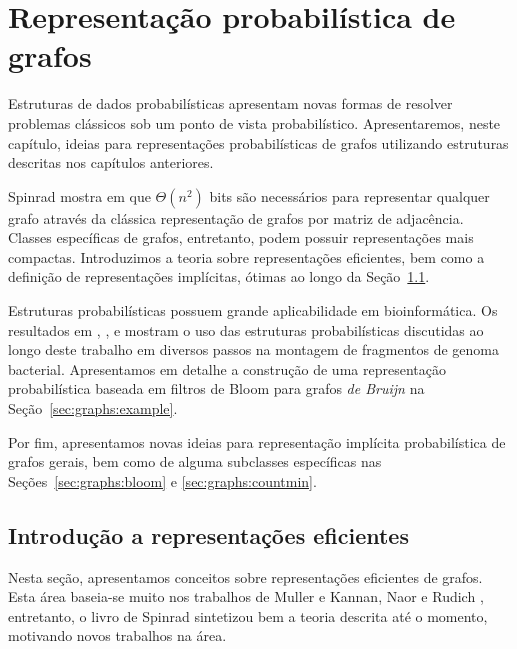\chapter{Representação probabilística de grafos}\label{cap:graphs}

Estruturas de dados probabilísticas apresentam novas formas de resolver problemas clássicos sob um ponto de vista probabilístico. Apresentaremos, neste capítulo, ideias para representações probabilísticas de grafos utilizando estruturas descritas nos capítulos anteriores.

Spinrad mostra em \cite{spinrad2003efficient} que $\Theta(n^2)$ bits são necessários para representar qualquer grafo através da clássica representação de grafos por matriz de adjacência. Classes específicas de grafos, entretanto, podem possuir representações mais compactas. Introduzimos a teoria sobre representações eficientes, bem como a definição de representações implícitas, ótimas ao longo da Seção~\ref{sec:graphs:implicit}.

Estruturas probabilísticas possuem grande aplicabilidade em bioinformática. Os resultados em \cite{pell2012scaling}, \cite{zhang2014these}, \cite{ondov2016mash} e \cite{junior2016efficient} mostram o uso das estruturas probabilísticas discutidas ao longo deste trabalho em diversos passos na montagem de fragmentos de genoma bacterial. Apresentamos em detalhe a construção de uma representação probabilística baseada em filtros de Bloom para grafos \emph{de Bruijn} na Seção~\ref{sec:graphs:example}.

Por fim, apresentamos novas ideias para representação implícita probabilística de grafos gerais, bem como de alguma subclasses específicas nas Seções~\ref{sec:graphs:bloom} e \ref{sec:graphs:countmin}.

\section{Introdução a representações eficientes}\label{sec:graphs:implicit}

Nesta seção, apresentamos conceitos sobre representações eficientes de grafos. Esta área baseia-se muito nos trabalhos de Muller \cite{muller1988local} e Kannan, Naor e Rudich \cite{kannan1992implicat}, entretanto, o livro de Spinrad \cite{spinrad2003efficient} sintetizou bem a teoria descrita até o momento, motivando novos trabalhos na área.

